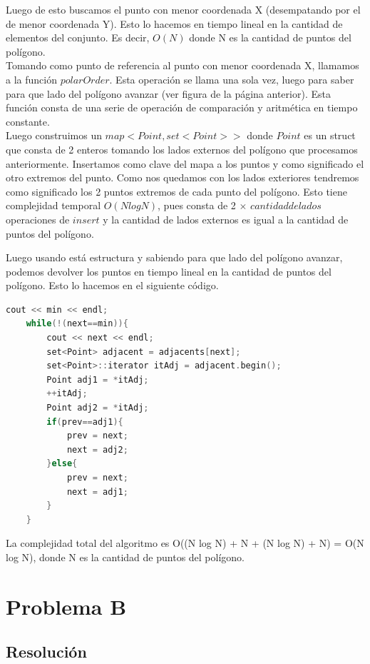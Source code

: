 \documentclass[a4paper]{article}
\begin{document}
Luego de esto buscamos el punto con menor coordenada X (desempatando por el de menor coordenada Y).
Esto lo hacemos en tiempo lineal en la cantidad de elementos del conjunto. Es decir, $O(N)$ donde N es la cantidad de puntos del polígono.\\

Tomando como punto de referencia al punto con menor coordenada X, llamamos a la función $polarOrder$. Esta operación se llama una sola vez, luego para saber para que lado del polígono avanzar (ver figura de la página anterior).
Esta función consta de una serie de operación de comparación y aritmética en tiempo constante.\\

Luego construimos un $map<Point, set<Point> >$ donde $Point$ es un struct que consta de 2 enteros tomando los lados externos del polígono que procesamos anteriormente. Insertamos como clave del mapa a los puntos y como significado el otro extremos del punto. Como nos quedamos con los lados exteriores tendremos como significado los 2 puntos extremos de cada punto del polígono. Esto tiene complejidad temporal $O(N log N)$, pues consta de 2 $\times$ $cantidad de lados$ operaciones de $insert$ y la cantidad de lados externos es igual a la cantidad de puntos del polígono.

Luego usando está estructura y sabiendo para que lado del polígono avanzar, podemos devolver los puntos en tiempo lineal en la cantidad de puntos del polígono. Esto lo hacemos en el siguiente código.

\begin{lstlisting}[language=c++]
	cout << min << endl;
	while(!(next==min)){
		cout << next << endl;
		set<Point> adjacent = adjacents[next];
		set<Point>::iterator itAdj = adjacent.begin();
		Point adj1 = *itAdj;
		++itAdj;
		Point adj2 = *itAdj;
		if(prev==adj1){
			prev = next;
			next = adj2;
		}else{
			prev = next;
			next = adj1;
		}
	}
\end{lstlisting}


La complejidad total del algoritmo es O((N log N) + N + (N log N) + N) = O(N log N), donde N es la cantidad de puntos del polígono.

\newpage
\section{Problema B}
\subsection{Resolución}
\end{document}
